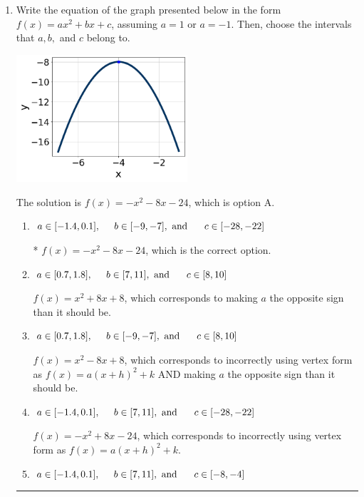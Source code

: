 \documentclass{extbook}[14pt]
\newcommand{\litem}[1]{\item #1

\rule{\textwidth}{0.4pt}}
\begin{document}
\begin{enumerate}\litem{
Write the equation of the graph presented below in the form $f(x)=ax^2+bx+c$, assuming  $a=1$ or $a=-1$. Then, choose the intervals that $a, b,$ and $c$ belong to.

\begin{center}
    \includegraphics[width=0.5\textwidth]{../Figures/quadraticGraphToEquationCopyA.png}
\end{center}




The solution is \( f(x) = -x^{2} -8 x -24 \), which is option A.\begin{enumerate}[label=\Alph*.]
\item \( a \in [-1.4, 0.1], \hspace*{5mm} b \in [-9, -7], \text{ and } \hspace*{5mm} c \in [-28, -22] \)

* $f(x)=-x^{2} -8 x -24$, which is the correct option.
\item \( a \in [0.7, 1.8], \hspace*{5mm} b \in [7, 11], \text{ and } \hspace*{5mm} c \in [8, 10] \)

$f(x)=x^{2} +8 x + 8$, which corresponds to making $a$ the opposite sign than it should be.
\item \( a \in [0.7, 1.8], \hspace*{5mm} b \in [-9, -7], \text{ and } \hspace*{5mm} c \in [8, 10] \)

$f(x)=x^{2} -8 x + 8$, which corresponds to incorrectly using vertex form as $f(x) = a(x+h)^2+k$ AND making $a$ the opposite sign than it should be.
\item \( a \in [-1.4, 0.1], \hspace*{5mm} b \in [7, 11], \text{ and } \hspace*{5mm} c \in [-28, -22] \)

$f(x)=-x^{2} +8 x -24$, which corresponds to incorrectly using vertex form as $f(x) = a(x+h)^2+k$.
\item \( a \in [-1.4, 0.1], \hspace*{5mm} b \in [7, 11], \text{ and } \hspace*{5mm} c \in [-8, -4] \)


\end{enumerate}}
\end{enumerate}
\end{document}

